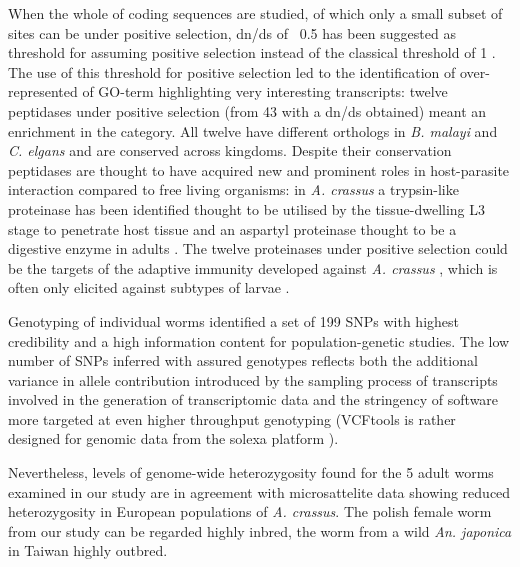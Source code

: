 \documentclass[10pt]{bmc_article}
\newenvironment{bmcformat}{\begin{raggedright}\baselineskip20pt\sloppy\setboolean{publ}{false}}{\end{raggedright}\baselineskip20pt\sloppy}
\begin{document}
\begin{bmcformat}
When the whole of coding sequences are studied, of which only a small
subset of sites can be under positive selection, dn/ds of ~0.5 has
been suggested as threshold for assuming positive selection
\cite{pmid15579698} instead of the classical threshold of 1
\cite{pmid6449605}. The use of this threshold for positive selection
led to the identification of over-represented of GO-term highlighting
very interesting transcripts: twelve peptidases under positive
selection (from 43 with a dn/ds obtained) meant an enrichment in the
category. All twelve have different orthologs in \textit{B. malayi}
and \textit{C. elgans} and are conserved across kingdoms. Despite
their conservation peptidases are thought to have acquired new and
prominent roles in host-parasite interaction compared to free living
organisms: in \textit{A. crassus} a trypsin-like proteinase has been
identified thought to be utilised by the tissue-dwelling L3 stage to
penetrate host tissue and an aspartyl proteinase thought to be a
digestive enzyme in adults \cite{polzer_identification_1993}. The
twelve proteinases under positive selection could be the targets of
the adaptive immunity developed against \textit{A. crassus}
\cite{knopf_migratory_2008, knopf_vaccination_2008}, which is often
only elicited against subtypes of larvae \cite{molnar_caps}.


Genotyping of individual worms identified a set of
199 SNPs with highest credibility and a high
information content for population-genetic studies. The low number of
SNPs inferred with assured genotypes reflects both the additional
variance in allele contribution introduced by the sampling process of
transcripts involved in the generation of transcriptomic data and the
stringency of software more targeted at even higher throughput
genotyping (VCFtools is rather designed for genomic data from the
solexa platform \cite{pmid21653522x}).

Nevertheless, levels of genome-wide heterozygosity found for the 5
adult worms examined in our study are in agreement with microsattelite
data \cite{wielgoss_population_2008} showing reduced heterozygosity in
European populations of \textit{A. crassus}. The polish female worm
from our study can be regarded highly inbred, the worm from a wild
\textit{An. japonica} in Taiwan highly outbred.


\end{bmcformat}
\end{document}
